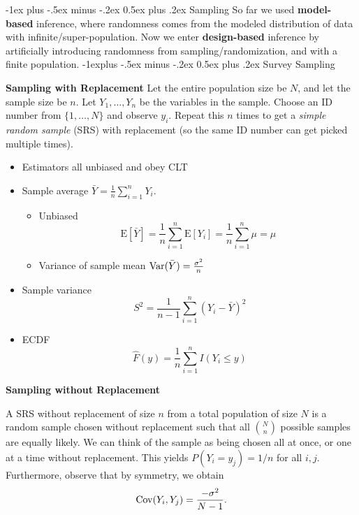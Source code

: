 \documentclass[10pt,landscape]{article}
\makeatletter
\renewcommand{\section}{\@startsection{section}{1}{0mm}%
                                {-1ex plus -.5ex minus -.2ex}%
                                {0.5ex plus .2ex}%
                                {\normalfont\large\bfseries}}
\renewcommand{\subsection}{\@startsection{subsection}{2}{0mm}%
                                {-1explus -.5ex minus -.2ex}%
                                {0.5ex plus .2ex}%
                                {\normalfont\normalsize\bfseries}}
\newcommand{\E}{\text{E}}
\makeatother
\begin{document}
\begin{multicols*}{3}
\section{Sampling}
So far we used \textbf{model-based} inference, where randomness comes from the modeled distribution of data with infinite/super-population. Now we enter \textbf{design-based} inference by artificially introducing randomness from sampling/randomization, and with a finite population.
\subsection{Survey Sampling}

\textbf{Sampling with Replacement}
Let the entire population size be $N$, and let the sample size be $n$. Let $Y_1,\dots,Y_n$ be the variables in the sample. Choose an ID number from $\{1,\dots,N\}$ and observe $y_i$. Repeat this $n$ times to get a \emph{simple random sample} (SRS) with replacement (so the same ID number can get picked multiple times). 
\begin{itemize}
    \item Estimators all unbiased and obey CLT
    \item Sample average $\bar Y=\frac{1}{n}\sum_{i=1}^nY_i$.
    \begin{itemize}
        \item Unbiased
        $$
        \E[\bar Y]=\frac{1}{n}\sum_{i=1}^n\E[Y_i]=\frac{1}{n}\sum_{i=1}^n\mu=\mu
        $$
        \item Variance of sample mean $\operatorname{Var}(\bar Y)=\frac{\sigma^2}{n}$
    \end{itemize}
    \item Sample variance
    $$
    S^2=\frac{1}{n-1}\sum_{i=1}^n(Y_i-\bar Y)^2
    $$
    \item ECDF
    $$
    \hat F(y)=\frac{1}{n}\sum_{i=1}^nI(Y_i\leq y)
    $$
\end{itemize}

\textbf{Sampling without Replacement}

A SRS without replacement of size $n$ from a total population of size $N$ is a random sample chosen without replacement such that all $ \binom{N}{n} $ possible samples are equally likely. We can think of the sample as being chosen all at once, or one at a time without replacement. This yields $P(Y_i = y_j) = 1/n$ for all $i,j$. Furthermore, observe that by symmetry, we obtain
\[
\operatorname{Cov}(Y_i,Y_j)=\frac{-\sigma^2}{N-1}.
\]


\end{multicols*}
\end{document}
